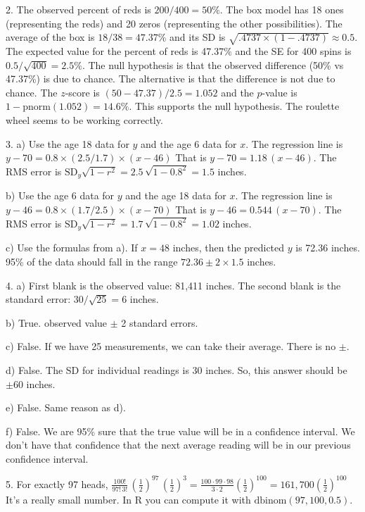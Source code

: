 \documentclass[10pt]{article}
\begin{document}
2. The observed percent of reds is $200/400=50\%$.  The box model has 18 ones (representing the reds)
and 20 zeros (representing the other possibilities).  The average of the box is $18/38 = 47.37\%$
and its SD is $\sqrt{.4737\times (1-.4737)}\approx 0.5$.  The expected value for the percent of
reds is 47.37\% and the SE for 400 spins is $0.5/\sqrt{400}=2.5\%$.  The null hypothesis is that
the observed difference (50\% vs 47.37\%) is due to chance.  The alternative is that the 
difference is not due to chance.  The $z$-score is $(50-47.37)/2.5 = 1.052$ and the
$p$-value is $1 - \mbox{pnorm}(1.052)=14.6\%$.  This supports the null hypothesis.  The roulette
wheel seems to be working correctly.
\medskip

3. a) Use the age 18 data for $y$ and the age 6 data for $x$. 
The regression line is $y-70 = 0.8\times (2.5/1.7)\times (x - 46)$
That is $ y - 70 = 1.18\,(x - 46)$.  The RMS error is $\mbox{SD}_y\sqrt{1-r^2}=
2.5\,\sqrt{1- 0.8^2} = 1.5$ inches.

b) Use the age 6 data for $y$ and the age 18 data for $x$. 
The regression line is $y-46 = 0.8\times (1.7/2.5)\times (x - 70)$
That is $ y - 46 = 0.544\,(x - 70)$.  The RMS error is $\mbox{SD}_y\sqrt{1-r^2}=
1.7\,\sqrt{1- 0.8^2} = 1.02$ inches.

c) Use the formulas from a).  If $x=48$ inches, then the predicted $y$ is
72.36 inches.  95\% of the data should fall in the range $72.36\pm 2\times 1.5$ inches.
\medskip

4. a) First blank is the observed value:  81,411 inches.  The second blank is the 
standard error:  $30/\sqrt{25}=6$ inches.

b) True.  observed value $\pm$ 2 standard errors.

c) False.  If we have 25 measurements, we can take their average.  There is no $\pm$.

d)  False.  The SD for individual readings is 30 inches. So, this answer should be $\pm 60$ inches.

e) False.  Same reason as d).
 
f)  False.  We are 95\% sure that the true value will be in a confidence interval.  We don't
have that confidence that the next average reading will be in our previous confidence interval.
\medskip

5. For exactly 97 heads, 
$\displaystyle \frac{100!}{97!\, 3!}\,\left(\frac{1}{2}\right)^{97}\,\left(\frac{1}{2}\right)^{3}
=\frac{100\cdot 99\cdot 98}{3\cdot 2}\left(\frac{1}{2}\right)^{100}
=161,\!700\left(\frac{1}{2}\right)^{100}$  It's a really small number.  In R you can compute it
with $\mbox{dbinom}(97, 100, 0.5)$.
\end{document}
